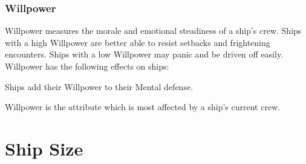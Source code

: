         \subsubsection{Willpower}
            Willpower measures the morale and emotional steadiness of a ship's crew.
            Ships with a high Willpower are better able to resist setbacks and frightening encounters.
            Ships with a low Willpower may panic and be driven off easily.
            Willpower has the following effects on ships:
            \begin{raggeditemize}
                \item Ships add their Willpower to their Mental defense.
            \end{raggeditemize}

            Willpower is the attribute which is most affected by a ship's current crew.

\section{Ship Size}\label{Ship Size}

